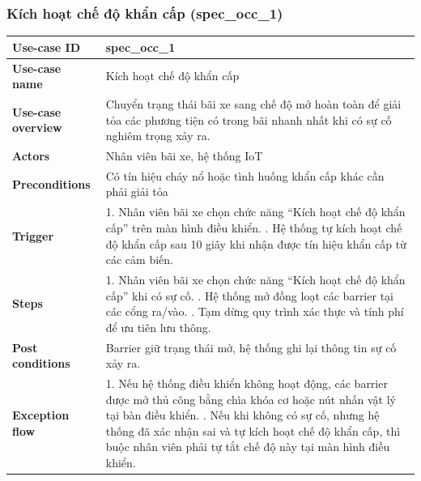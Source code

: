\subsubsection{Kích hoạt chế độ khẩn cấp (spec\_occ\_1)}
\begingroup
\small
\begin{longtable}{|>{\centering\arraybackslash}m{3cm}|m{13.7cm}|}
\hline
\textbf{Use-case ID} & spec\_occ\_1   \\ \hline
\textbf{Use-case name} & Kích hoạt chế độ khẩn cấp   \\ \hline
\textbf{Use-case overview} & Chuyển trạng thái bãi xe sang chế độ mở hoàn toàn để giải tỏa các phương tiện có trong bãi nhanh nhất khi có sự cố nghiêm trọng xảy ra. \\ \hline
\textbf{Actors} & Nhân viên bãi xe, hệ thống IoT   \\ \hline
\textbf{Preconditions} & Có tín hiệu cháy nổ hoặc tình huống khẩn cấp khác cần phải giải tỏa   \\ \hline
\textbf{Trigger} & 1. Nhân viên bãi xe chọn chức năng “Kích hoạt chế độ khẩn cấp” trên màn hình điều khiển. \newline 2. Hệ thống tự kích hoạt chế độ khẩn cấp sau 10 giây khi nhận được tín hiệu khẩn cấp từ các cảm biến. \\ \hline
\textbf{Steps} & 
1. Nhân viên bãi xe chọn chức năng “Kích hoạt chế độ khẩn cấp” khi có sự cố. \newline
2. Hệ thống mở đồng loạt các barrier tại các cổng ra/vào. \newline
3. Tạm dừng quy trình xác thực và tính phí để ưu tiên lưu thông. \\ \hline
\textbf{Post conditions} & Barrier giữ trạng thái mở, hệ thống ghi lại thông tin sự cố xảy ra. \\ \hline
\textbf{Exception flow} & 1. Nếu hệ thống điều khiển không hoạt động, các barrier được mở thủ công bằng chìa khóa cơ hoặc nút nhấn vật lý tại bàn điều khiển. \newline
2. Nếu khi không có sự cố, nhưng hệ thống đã xác nhận sai và tự kích hoạt chế độ khẩn cấp, thì buộc nhân viên phải tự tắt chế độ này tại màn hình điều khiển. \\ \hline
\end{longtable}
\endgroup


